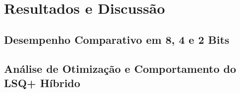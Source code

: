 \section{Resultados e Discussão}


\subsection{Desempenho Comparativo em 8, 4 e 2 Bits}

\subsection{Análise de Otimização e Comportamento do LSQ+ Híbrido}
